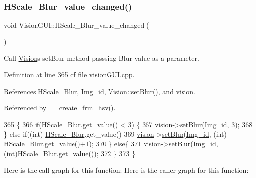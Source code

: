 \subsubsection{\texorpdfstring{H\+Scale\+\_\+\+Blur\+\_\+value\+\_\+changed()}{HScale\_Blur\_value\_changed()}}
{\footnotesize\ttfamily void Vision\+G\+U\+I\+::\+H\+Scale\+\_\+\+Blur\+\_\+value\+\_\+changed (\begin{DoxyParamCaption}{ }\end{DoxyParamCaption})\hspace{0.3cm}{\ttfamily [private]}}



Call \hyperlink{class_vision}{Vision}\textquotesingle{}s set\+Blur method passsing Blur value as a parameter. 



Definition at line 365 of file vision\+G\+U\+I.\+cpp.



References H\+Scale\+\_\+\+Blur, Img\+\_\+id, Vision\+::set\+Blur(), and vision.



Referenced by \+\_\+\+\_\+create\+\_\+frm\+\_\+hsv().


\begin{DoxyCode}
365                                           \{
366     \textcolor{keywordflow}{if}(\hyperlink{class_vision_g_u_i_a88fa2852521012287ae804404280c57f}{HScale\_Blur}.get\_value() < 3) \{
367         \hyperlink{class_vision_g_u_i_a36aba058af844ec6cbe0c945c616cd5f}{vision}->\hyperlink{class_vision_aa40b48aebdf61dfda490fbc2620d2ac3}{setBlur}(\hyperlink{class_vision_g_u_i_a4a46f114bc58e0f1d56b655f4bc8f9d8}{Img\_id}, 3);
368     \} \textcolor{keywordflow}{else} \textcolor{keywordflow}{if}((\textcolor{keywordtype}{int}) \hyperlink{class_vision_g_u_i_a88fa2852521012287ae804404280c57f}{HScale\_Blur}.get\_value() %
369         \hyperlink{class_vision_g_u_i_a36aba058af844ec6cbe0c945c616cd5f}{vision}->\hyperlink{class_vision_aa40b48aebdf61dfda490fbc2620d2ac3}{setBlur}(\hyperlink{class_vision_g_u_i_a4a46f114bc58e0f1d56b655f4bc8f9d8}{Img\_id}, (\textcolor{keywordtype}{int}) \hyperlink{class_vision_g_u_i_a88fa2852521012287ae804404280c57f}{HScale\_Blur}.get\_value()+1);
370     \} \textcolor{keywordflow}{else}\{
371         \hyperlink{class_vision_g_u_i_a36aba058af844ec6cbe0c945c616cd5f}{vision}->\hyperlink{class_vision_aa40b48aebdf61dfda490fbc2620d2ac3}{setBlur}(\hyperlink{class_vision_g_u_i_a4a46f114bc58e0f1d56b655f4bc8f9d8}{Img\_id}, (\textcolor{keywordtype}{int})\hyperlink{class_vision_g_u_i_a88fa2852521012287ae804404280c57f}{HScale\_Blur}.get\_value());
372     \}
373 \}
\end{DoxyCode}
Here is the call graph for this function\+:
Here is the caller graph for this function\+:
\mbox{\label{class_vision_g_u_i_a77d74bbe2fdcc16d5cf18094d257d219}} 
